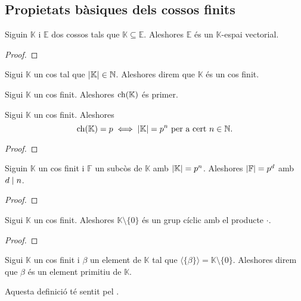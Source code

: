 \documentclass[../../Main.tex]{subfiles}
\begin{document}
	\subsection{Propietats bàsiques dels cossos finits}
	\begin{proposition}
		\label{prop:un subcòs és un espai vectorial}
		Siguin \(\mathbb{K}\) i \(\mathbb{E}\) dos cossos tals que \(\mathbb{K}\subseteq\mathbb{E}\). Aleshores \(\mathbb{E}\) és un \(\mathbb{K}\)-espai vectorial.
		\begin{proof}
		\end{proof}
	\end{proposition}
	\begin{definition}
		\label{def:cos finit}
		Sigui \(\mathbb{K}\) un cos tal que \(\abs{\mathbb{K}}\in\mathbb{N}\). Aleshores direm que \(\mathbb{K}\) és un cos finit.
	\end{definition}
	\begin{observation}
		Sigui \(\mathbb{K}\) un cos finit. Aleshores \(\operatorname{ch}(\mathbb{K})\) és primer.
	\end{observation}
	\begin{theorem}
		Sigui \(\mathbb{K}\) un cos finit. Aleshores
		\[\ch(\mathbb{K})=p\sii\abs{\mathbb{K}}=p^{n}\text{ per a cert }n\in\mathbb{N}.\]
		\begin{proof}
		\end{proof}
	\end{theorem}
	\begin{corollary}
		Siguin \(\mathbb{K}\) un cos finit i \(\mathbb{F}\) un subcòs de \(\mathbb{K}\) amb \(\abs{\mathbb{K}}=p^{n}\). Aleshores \(\abs{\mathbb{F}}=p^{d}\) amb \(d\mathrel{|} n\).
		\begin{proof}
		\end{proof}
	\end{corollary}
	\begin{theorem}
		\label{thm:teorema de l'element primitiu}
		Sigui \(\mathbb{K}\) un cos finit. Aleshores \(\mathbb{K}\setminus\{0\}\) és un grup cíclic amb el producte \(\cdot\).
		\begin{proof}
		\end{proof}
	\end{theorem}
	\begin{definition}
		\label{def:element primitiu d'un cos finit}
		Sigui \(\mathbb{K}\) un cos finit i \(\beta\) un element de \(\mathbb{K}\) tal que \(\langle\{\beta\}\rangle=\mathbb{K}\setminus\{0\}\). Aleshores direm que \(\beta\) és un element primitiu de \(\mathbb{K}\).
		
		Aquesta definició té sentit pel .
	\end{definition}
\end{document}
